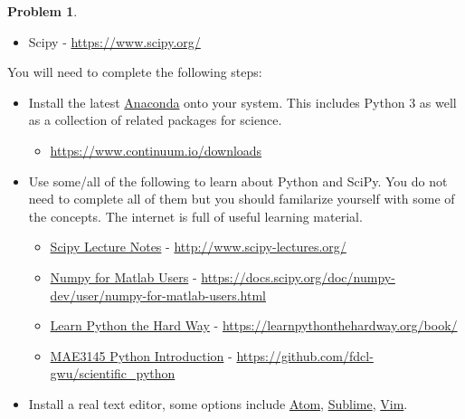 \documentclass[10pt]{article}
\renewcommand{\baselinestretch}{1.2}
\theoremstyle{definition}
\newtheorem{prob}{Problem}[section]
\begin{document}
\begin{prob}
\begin{itemize}
\begin{itemize}
            \item Scipy - \href{https://www.scipy.org/}{https://www.scipy.org/}
        \end{itemize}
\end{itemize}
You will need to complete the following steps: 
\begin{itemize}
    \item Install the latest \href{https://www.continuum.io/downloads}{Anaconda} onto your system. 
        This includes Python 3 as well as a collection of related packages for science. 
        \begin{itemize}
            \item \href{https://www.continuum.io/downloads}{https://www.continuum.io/downloads}
        \end{itemize}

    \item Use some/all of the following to learn about Python and SciPy.
        You do not need to complete all of them but you should familarize yourself with some of the concepts. 
        The internet is full of useful learning material.
        \begin{itemize}
            \item \href{http://www.scipy-lectures.org/}{Scipy Lecture Notes} -  \href{http://www.scipy-lectures.org/}{http://www.scipy-lectures.org/}
            \item \href{https://docs.scipy.org/doc/numpy-dev/user/numpy-for-matlab-users.html}{Numpy for Matlab Users} - \href{https://docs.scipy.org/doc/numpy-dev/user/numpy-for-matlab-users.html}{https://docs.scipy.org/doc/numpy-dev/user/numpy-for-matlab-users.html}
            \item \href{https://learnpythonthehardway.org/book/}{Learn Python the Hard Way} - \href{https://learnpythonthehardway.org/book/}{https://learnpythonthehardway.org/book/}
            \item \href{https://github.com/fdcl-gwu/scientific_python}{MAE3145 Python Introduction} - \href{https://github.com/fdcl-gwu/scientific_python}{https://github.com/fdcl-gwu/scientific\_python}
        \end{itemize}
    \item Install a real text editor, some options include \href{https://atom.io/}{Atom}, \href{https://www.sublimetext.com/}{Sublime}, \href{http://www.vim.org/download.php}{Vim}.
\end{itemize}

\end{prob}


%
%
%
%
\end{document}
